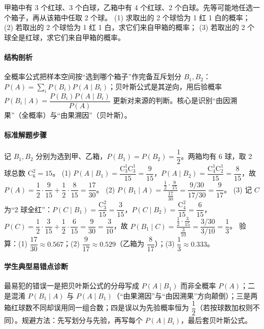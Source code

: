 \begin{problem}
甲箱中有 3 个红球、3 个白球，乙箱中有 4 个红球、2 个白球。先等可能地任选一个箱子，再从该箱中任取 2 个球。
(1) 求取出的 2 个球恰为 1 红 1 白的概率；
(2) 若取出的 2 个球恰为 1 红 1 白，求它们来自甲箱的概率；
(3) 若取出的 2 个球全是红球，求它们来自甲箱的概率。
\end{problem}
\begin{solution}
\paragraph{结构剖析}
全概率公式把样本空间按“选到哪个箱子”作完备互斥划分 $B_1,B_2$：$P(A)=\sum_i P(B_i)P(A\mid B_i)$；贝叶斯公式是其逆向，用后验概率 $P(B_i\mid A)=\dfrac{P(B_i)P(A\mid B_i)}{P(A)}$ 更新对来源的判断。核心是识别“由因溯果”（全概率）与“由果溯因”（贝叶斯）。
\paragraph{标准解题步骤}
记 $B_1,B_2$ 分别为选到甲、乙箱，$P(B_1)=P(B_2)=\dfrac12$。两箱均有 6 球，取 2 球总数 $\mathrm{C}_6^2=15$。
(1) $P(A\mid B_1)=\dfrac{\mathrm{C}_3^1\mathrm{C}_3^1}{15}=\dfrac9{15}$，$P(A\mid B_2)=\dfrac{\mathrm{C}_4^1\mathrm{C}_2^1}{15}=\dfrac8{15}$，故
$P(A)=\dfrac12\cdot\dfrac9{15}+\dfrac12\cdot\dfrac8{15}=\dfrac{17}{30}$。
(2) $P(B_1\mid A)=\dfrac{\frac12\cdot\frac9{15}}{\frac{17}{30}}=\dfrac{9/30}{17/30}=\dfrac9{17}$。
(3) 记 $C$ 为“2 球全红”：$P(C\mid B_1)=\dfrac{\mathrm{C}_3^2}{15}=\dfrac3{15}$，$P(C\mid B_2)=\dfrac{\mathrm{C}_4^2}{15}=\dfrac6{15}$，$P(C)=\dfrac12\cdot\dfrac3{15}+\dfrac12\cdot\dfrac6{15}=\dfrac{9}{30}=\dfrac3{10}$，故 $P(B_1\mid C)=\dfrac{\frac12\cdot\frac3{15}}{\frac3{10}}=\dfrac{3/30}{3/10}=\dfrac13$。
验算：(1) $\dfrac{17}{30}\approx0.567$；(2) $\dfrac9{17}\approx0.529$（乙箱为 $\dfrac8{17}$）；(3) $\dfrac13\approx0.333$。
\paragraph{学生典型易错点诊断}
最易犯的错误一是把贝叶斯公式的分母写成 $P(A\mid B_1)$ 而非全概率 $P(A)$；二是混淆 $P(B_1\mid A)$ 与 $P(A\mid B_1)$（“由果溯因”与“由因溯果”方向颠倒）；三是两箱红球数不同却误用同一组合数；四是误以为先验概率恒为 $\dfrac12$（若按球数加权则不同）。规避方法：先写划分与先验，再写每个 $P(A\mid B_i)$，最后套贝叶斯公式。
\end{solution}

